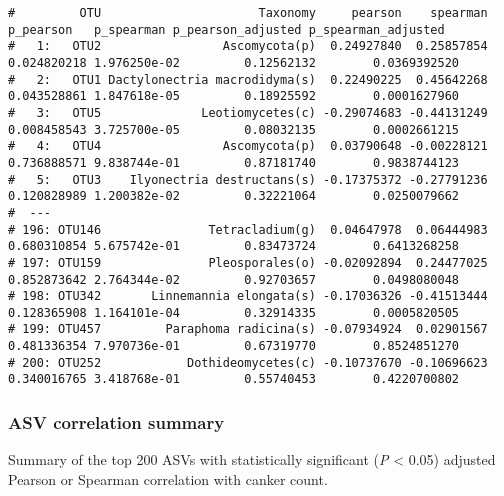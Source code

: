 \documentclass[
]{article}
\newenvironment{Shaded}{\begin{snugshade}}{\end{snugshade}}
\newcommand{\CommentTok}[1]{\textcolor[rgb]{0.56,0.35,0.01}{\textit{#1}}}
\newcommand{\FloatTok}[1]{\textcolor[rgb]{0.00,0.00,0.81}{#1}}
\newcommand{\NormalTok}[1]{#1}
\newcommand{\OtherTok}[1]{\textcolor[rgb]{0.56,0.35,0.01}{#1}}
\newcommand{\SpecialCharTok}[1]{\textcolor[rgb]{0.00,0.00,0.00}{#1}}
\begin{document}
\begin{verbatim}
#         OTU                      Taxonomy     pearson    spearman   p_pearson   p_spearman p_pearson_adjusted p_spearman_adjusted
#   1:   OTU2                 Ascomycota(p)  0.24927840  0.25857854 0.024820218 1.976250e-02         0.12562132        0.0369392520
#   2:   OTU1 Dactylonectria macrodidyma(s)  0.22490225  0.45642268 0.043528861 1.847618e-05         0.18925592        0.0001627960
#   3:   OTU5              Leotiomycetes(c) -0.29074683 -0.44131249 0.008458543 3.725700e-05         0.08032135        0.0002661215
#   4:   OTU4                 Ascomycota(p)  0.03790648 -0.00228121 0.736888571 9.838744e-01         0.87181740        0.9838744123
#   5:   OTU3    Ilyonectria destructans(s) -0.17375372 -0.27791236 0.120828989 1.200382e-02         0.32221064        0.0250079662
#  ---                                                                                                                             
# 196: OTU146               Tetracladium(g)  0.04647978  0.06444983 0.680310854 5.675742e-01         0.83473724        0.6413268258
# 197: OTU159               Pleosporales(o) -0.02092894  0.24477025 0.852873642 2.764344e-02         0.92703657        0.0498080048
# 198: OTU342       Linnemannia elongata(s) -0.17036326 -0.41513444 0.128365908 1.164101e-04         0.32914335        0.0005820505
# 199: OTU457         Paraphoma radicina(s) -0.07934924  0.02901567 0.481336354 7.970736e-01         0.67319770        0.8524851270
# 200: OTU252            Dothideomycetes(c) -0.10737670 -0.10696623 0.340016765 3.418768e-01         0.55740453        0.4220700802
\end{verbatim}

\hypertarget{asv-correlation-summary}{%
\subsubsection{ASV correlation summary}\label{asv-correlation-summary}}

Summary of the top 200 ASVs with statistically significant (\emph{P}
\textless{} 0.05) adjusted Pearson or Spearman correlation with canker
count.

\begin{Shaded}
\end{Shaded}
\end{document}

